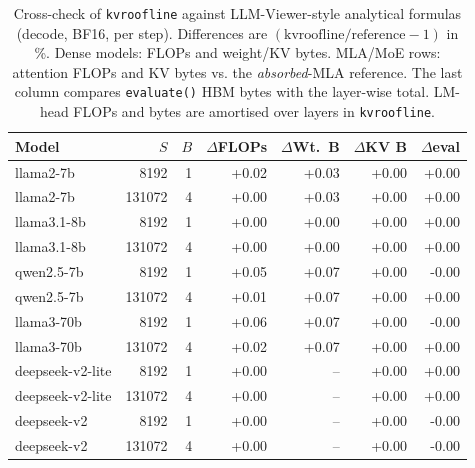 \begin{table}[t]
\centering
\small
\caption{Cross-check of \texttt{kvroofline} against LLM-Viewer-style analytical formulas (decode, BF16, per step). Differences are $(\text{kvroofline}/\text{reference}-1)$ in \%. Dense models: FLOPs and weight/KV bytes. MLA/MoE rows: attention FLOPs and KV bytes vs. the \emph{absorbed}-MLA reference. The last column compares \texttt{evaluate()} HBM bytes with the layer-wise total. LM-head FLOPs and bytes are amortised over layers in \texttt{kvroofline}.}
\label{tab:llmviewer}
\begin{tabular}{lrrrrrr}
\toprule
Model & $S$ & $B$ & $\Delta$FLOPs & $\Delta$Wt.\ B & $\Delta$KV B & $\Delta$eval \\
\midrule
llama2-7b & 8192 & 1 & +0.02 & +0.03 & +0.00 & +0.00 \\
llama2-7b & 131072 & 4 & +0.00 & +0.03 & +0.00 & +0.00 \\
llama3.1-8b & 8192 & 1 & +0.00 & +0.00 & +0.00 & +0.00 \\
llama3.1-8b & 131072 & 4 & +0.00 & +0.00 & +0.00 & +0.00 \\
qwen2.5-7b & 8192 & 1 & +0.05 & +0.07 & +0.00 & -0.00 \\
qwen2.5-7b & 131072 & 4 & +0.01 & +0.07 & +0.00 & +0.00 \\
llama3-70b & 8192 & 1 & +0.06 & +0.07 & +0.00 & -0.00 \\
llama3-70b & 131072 & 4 & +0.02 & +0.07 & +0.00 & +0.00 \\
deepseek-v2-lite & 8192 & 1 & +0.00 & -- & +0.00 & +0.00 \\
deepseek-v2-lite & 131072 & 4 & +0.00 & -- & +0.00 & +0.00 \\
deepseek-v2 & 8192 & 1 & +0.00 & -- & +0.00 & -0.00 \\
deepseek-v2 & 131072 & 4 & +0.00 & -- & +0.00 & -0.00 \\
\bottomrule
\end{tabular}
\end{table}